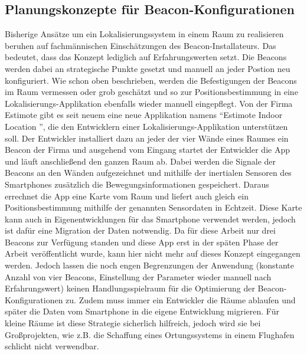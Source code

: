 \subsection{Planungskonzepte für Beacon-Konfigurationen}
Bisherige Ansätze um ein Lokalisierungssystem in einem Raum zu realisieren beruhen auf fachmännischen Einschätzungen des Beacon-Installateurs. Das bedeutet, dass das Konzept lediglich auf Erfahrungswerten setzt. Die Beacons werden dabei an strategische Punkte gesetzt und manuell an jeder Postion neu konfiguriert. Wie schon oben beschrieben, werden die Befestigungen der Beacons im Raum vermessen oder grob geschätzt und so zur Positionsbestimmung in eine Lokalisierungs-Applikation ebenfalls wieder manuell eingepflegt. Von der Firma Estimote gibt es seit neuem eine neue Applikation namens "`Estimote Indoor Location "', die den Entwicklern einer Lokalisierungs-Applikation unterstützen soll. Der Entwickler installiert dazu an jeder der vier Wände eines Raumes ein Beacon der Firma und ausgehend vom Eingang startet der Entwickler die App und läuft anschließend den ganzen Raum ab. Dabei werden die Signale der Beacons an den Wänden aufgezeichnet und mithilfe der inertialen Sensoren des Smartphones zusätzlich die Bewegungsinformationen gespeichert. Daraus errechnet die App eine Karte vom Raum und liefert auch gleich ein Positionsbestimmung mithilfe der genannten Sensordaten in Echtzeit. Diese Karte kann auch in Eigenentwicklungen für das Smartphone verwendet werden, jedoch ist dafür eine Migration der Daten notwendig. Da für diese Arbeit nur drei Beacons zur Verfügung standen und diese App erst in der späten Phase der Arbeit veröffentlicht wurde, kann hier nicht mehr auf dieses Konzept eingegangen werden. Jedoch lassen die noch engen Begrenzungen der Anwendung (konstante Anzahl von vier Beacons, Einstellung der Parameter wieder manuell nach Erfahrungswert) keinen Handlungsspielraum für die Optimierung der Beacon-Konfigurationen zu. Zudem muss immer ein Entwickler die Räume ablaufen und später die Daten vom Smartphone in die eigene Entwicklung migrieren. Für kleine Räume ist diese Strategie sicherlich hilfreich, jedoch wird sie bei Großprojekten, wie z.B. die Schaffung eines Ortungssystems in einem Flughafen schlicht nicht verwendbar.
